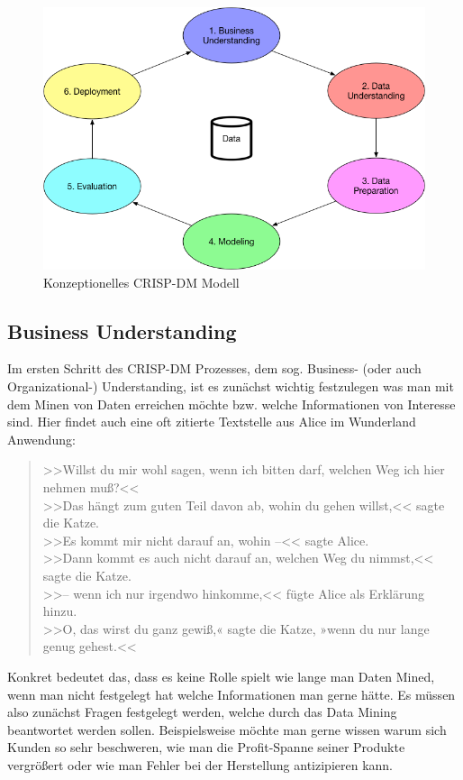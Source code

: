 \begin{figure}[htb]
	\includegraphics[width=\textwidth]{gfx/CRISP-DM_Model.png}
	\caption{Konzeptionelles CRISP-DM Modell}
	\label{fig:process:crispdm}
\end{figure}

\subsection{Business Understanding}
\label{sec:process:crispdm:bu}

Im ersten Schritt des CRISP-DM Prozesses, dem sog. Business- (oder auch Organizational-) Understanding,
ist es zunächst wichtig festzulegen was man mit dem Minen von Daten erreichen
möchte bzw. welche Informationen von Interesse sind. Hier findet auch eine oft
zitierte Textstelle aus Alice im Wunderland Anwendung:
\begin{quotation}
  >>Willst du mir wohl sagen, wenn ich bitten darf, welchen Weg ich hier nehmen muß?<< \\
  >>Das hängt zum guten Teil davon ab, wohin du gehen willst,<< sagte die Katze. \\
  >>Es kommt mir nicht darauf an, wohin –<< sagte Alice. \\
  >>Dann kommt es auch nicht darauf an, welchen Weg du nimmst,<< sagte die Katze. \\
  >>– wenn ich nur irgendwo hinkomme,<< fügte Alice als Erklärung hinzu. \\
  >>O, das wirst du ganz gewiß,« sagte die Katze, »wenn du nur lange genug gehest.<<
\end{quotation}
Konkret bedeutet das, dass es keine Rolle spielt wie lange man Daten Mined, wenn
man nicht festgelegt hat welche Informationen man gerne hätte. Es müssen also
zunächst Fragen festgelegt werden, welche durch das Data Mining beantwortet
werden sollen. Beispielsweise möchte man gerne wissen warum sich Kunden so sehr
beschweren, wie man die Profit-Spanne seiner Produkte vergrößert oder wie man
Fehler bei der Herstellung antizipieren kann.

